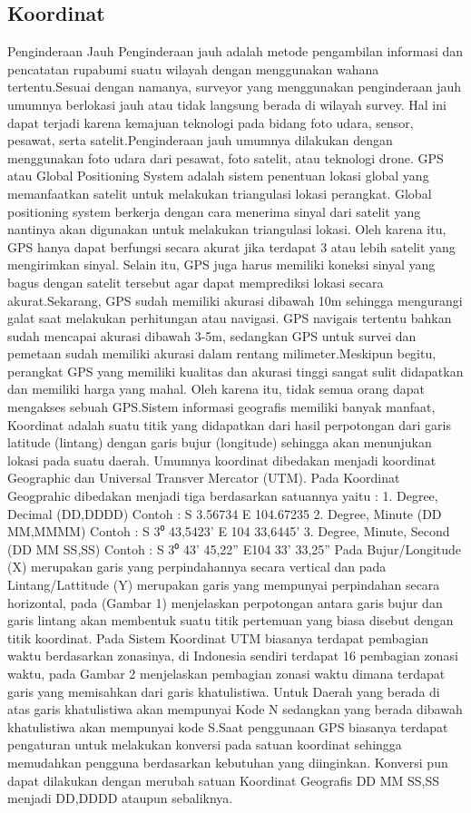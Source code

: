 \subsection{Koordinat}
Penginderaan Jauh
Penginderaan jauh adalah metode pengambilan informasi dan pencatatan rupabumi suatu wilayah dengan menggunakan wahana tertentu.Sesuai dengan namanya, surveyor yang menggunakan penginderaan jauh umumnya berlokasi jauh atau tidak langsung berada di wilayah survey. Hal ini dapat terjadi karena kemajuan teknologi pada bidang foto udara, sensor, pesawat, serta satelit.Penginderaan jauh umumnya dilakukan dengan menggunakan foto udara dari pesawat, foto satelit, atau teknologi drone.
GPS atau Global Positioning System adalah sistem penentuan lokasi global yang memanfaatkan satelit untuk melakukan triangulasi lokasi perangkat.
Global positioning system berkerja dengan cara menerima sinyal dari satelit yang nantinya akan digunakan untuk melakukan triangulasi lokasi. Oleh karena itu, GPS hanya dapat berfungsi secara akurat jika terdapat 3 atau lebih satelit yang mengirimkan sinyal.
Selain itu, GPS juga harus memiliki koneksi sinyal yang bagus dengan satelit tersebut agar dapat memprediksi lokasi secara akurat.Sekarang, GPS sudah memiliki akurasi dibawah 10m sehingga mengurangi galat saat melakukan perhitungan atau navigasi. GPS navigais tertentu bahkan sudah mencapai akurasi dibawah 3-5m, sedangkan GPS untuk survei dan pemetaan sudah memiliki akurasi dalam rentang milimeter.Meskipun begitu, perangkat GPS yang memiliki kualitas dan akurasi tinggi sangat sulit didapatkan dan memiliki harga yang mahal. Oleh karena itu, tidak semua orang dapat mengakses sebuah GPS.Sistem informasi geografis memiliki banyak manfaat, 
Koordinat adalah suatu titik yang didapatkan dari hasil perpotongan dari garis latitude (lintang) dengan garis bujur (longitude) sehingga akan menunjukan lokasi pada suatu daerah. Umumnya koordinat dibedakan menjadi koordinat Geographic dan Universal Transver Mercator (UTM). Pada Koordinat Geogprahic dibedakan menjadi tiga berdasarkan satuannya yaitu :
1.	Degree, Decimal (DD,DDDD) Contoh : S 3.56734 E 104.67235
2.	Degree, Minute (DD MM,MMMM) Contoh : S 3⁰ 43,5423’ E 104 33,6445’
3.	Degree, Minute, Second (DD MM SS,SS) Contoh : S 3⁰ 43’ 45,22” E104 33’ 33,25”
Pada Bujur/Longitude (X) merupakan garis yang perpindahannya secara vertical dan pada Lintang/Lattitude (Y) merupakan garis yang mempunyai perpindahan secara horizontal, pada (Gambar 1) menjelaskan perpotongan antara garis bujur dan garis lintang akan membentuk suatu titik pertemuan yang biasa disebut dengan titik koordinat. Pada Sistem Koordinat UTM biasanya terdapat pembagian waktu berdasarkan zonasinya, di Indonesia sendiri terdapat 16 pembagian zonasi waktu, pada Gambar 2 menjelaskan pembagian zonasi waktu dimana terdapat garis yang memisahkan dari garis khatulistiwa. Untuk Daerah yang berada di atas garis khatulistiwa akan mempunyai Kode N sedangkan yang berada dibawah khatulistiwa akan mempunyai kode S.Saat penggunaan GPS biasanya terdapat pengaturan untuk melakukan konversi pada satuan koordinat sehingga memudahkan pengguna berdasarkan kebutuhan yang diinginkan. Konversi pun dapat dilakukan dengan merubah satuan Koordinat Geografis DD MM SS,SS menjadi DD,DDDD ataupun sebaliknya.

